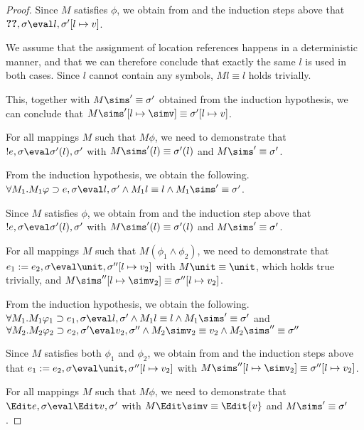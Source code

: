 \begin{proof}
{  Since $M$ satisfies $\phi$,
  we obtain from  and the induction steps above that $\Ref e,\sigma\eval l,\sigma'[l\mapsto v]$.

  We assume that the assignment of location references happens in a deterministic manner, and that we can therefore conclude that exactly the same $l$ is used in both cases. Since $l$ cannot contain any symbols, $M l \equiv l$ holds trivially.

  This, together with $M \sims' \equiv{\sigma'}$ obtained from the induction hypothesis, we can conclude that $M\sims'[l\mapsto \simv]\equiv{\sigma'}[l\mapsto{v}]$.
  }

  {For all mappings $M$ such that $M\phi$, we need to demonstrate that $!e,\sigma\eval\sigma'(l),\sigma'$ with
  $M \sims'(l) \equiv {\sigma'}(l)$ and $M\sims'\equiv{\sigma'}$.

  From the induction hypothesis, we obtain the following.\\
  $\forall M_1 .  M_1\phi \implies e, \sigma {\eval}l,{\sigma'}\land  M_1l\equiv l \land  M_1\sims'\equiv{\sigma'}$.

  Since $M$ satisfies $\phi$,
  we obtain from  and the induction step above that $!e,\sigma {\eval}\sigma'(l),{\sigma'}$ with $M \sims'(l) \equiv {\sigma'}(l)$
  and $M\sims'\equiv{\sigma'}$.
}

  {
  For all mappings $M$ such that $M(\phi_1\wedge \phi_2)$,
  we need to demonstrate that\\
  $e_1 := e_2,\sigma\eval\unit,\sigma''[l\mapsto v_2]$ with
  $M\unit \equiv \unit$, which holds true trivially,
  and $M\sims''[l\mapsto \simv_2]\equiv{\sigma''}[l\mapsto{v_2}]$.

  From the induction hypothesis, we obtain the following.\\
  $\forall M_1 .  M_1\phi_1 \implies e_1, \sigma {\eval}l,{\sigma'}\land  M_1 l\equiv l \land  M_1\sims'\equiv{\sigma'}$ and\\
  $\forall M_2 . M_2\phi_2 \implies e_2,\sigma' {\eval}{v_2},{\sigma''}\land M_2\simv_2\equiv {v_2} \land M_2\sims''\equiv{\sigma''}$

  Since $M$ satisfies both $\phi_1$ and $\phi_2$, we obtain from  and the induction steps above that $e_1 := e_2,\sigma\eval\unit,\sigma''[l\mapsto v_2]$ with $M\sims''[l\mapsto \simv_2]\equiv{\sigma''}[l\mapsto{v_2}]$.
  }

  {For all mappings $M$ such that $M\phi$,
  we need to demonstrate that $\Edit e,\sigma\eval\Edit v,\sigma'$ with
  $M \Edit \simv \equiv \Edit {v}$ and $M\sims'\equiv{\sigma'}$.

}
\end{proof}
